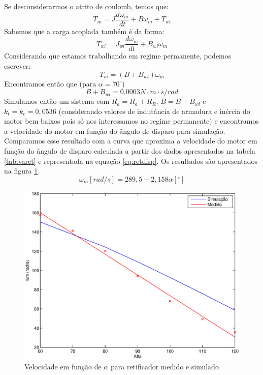 \documentclass{article}
\begin{document}
Se desconsiderarmos o atrito de coulomb, temos que:
\begin{equation}
	T_m = J\frac{d\omega_m}{dt} + B\omega_m + T_{wl}
\end{equation}
Sabemos que a carga acoplada também é da forma:
\begin{equation}
	T_{wl} = J_{wl}\frac{d\omega_m}{dt} + B_{wl}\omega_m
\end{equation}
Considerando que estamos trabalhando em regime permanente, podemos escrever:
\begin{equation}
T_m = (B + B_{wl})\omega_m
\end{equation}
Encontramos então que (para $\alpha = 70^\circ$)
\begin{equation}
	B + B_{wl} = 0.0003 N\cdot m\cdot s/rad
\end{equation}
Simulamos então um sistema com $R_a = R_a + R_R$, $B = B + B_{wl}$ e $k_t = k_e = 0,0536$ (considerando valores de indutância de armadura e inércia do motor bem baixos pois só nos interessamos no regime permanente) e encontramos a velocidade do motor em função do ângulo de disparo para simulação. Comparamos esse resultado com a curva que aproxima a velocidade do motor em função do ângulo de disparo calculada a partir dos dados apresentados na tabela \ref{tab:varet} e representada na equação \ref{eq:retdisp}. Os resultados são apresentados na figura \ref{fig:retalfa}.
\begin{equation}
	\omega_m [rad/s] = 289,5 - 2,158 \alpha [^\circ]
	\label{eq:retdisp}
\end{equation}

\begin{figure} [H]
	\centering
	\includegraphics[width=\linewidth]{Dados/Retificador/walfa}
	\caption{Velocidade em função de $\alpha$ para retificador medido e simulado}
	\label{fig:retalfa}
\end{figure}
\end{document}
